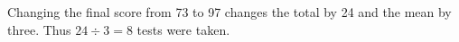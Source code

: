 Changing the final score from 73 to 97 changes the total by 24 and the mean by three. Thus $24\div3=\boxed8$ tests were taken.
